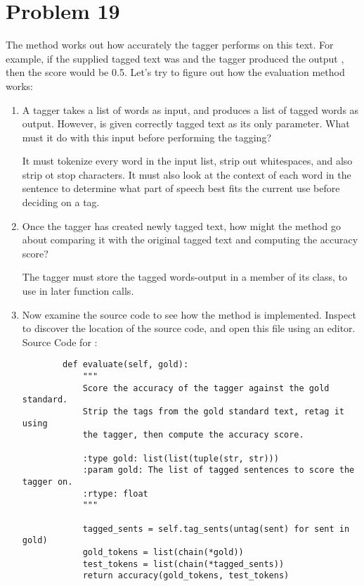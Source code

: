 \documentclass[12pt]{article}
\begin{document}
	\section*{Problem 19}
	The  method works out how accurately the tagger performs on this text. For example, if the supplied tagged text was  and the tagger produced the output , then the score would be 0.5. Let's try to figure out how the evaluation method works:
	\begin{enumerate}
		\item A tagger  takes a list of words as input, and produces a list of tagged words as output. However,  is given correctly tagged text as its only parameter. What must it do with this input before performing the tagging?
		
		It must tokenize every word in the input list, strip out whitespaces, and also strip ot stop characters. It must also look at the context of each word in the sentence to determine what part of speech best fits the current use before deciding on a tag. 
		
		\item Once the tagger has created newly tagged text, how might the  method go about comparing it with the original tagged text and computing the accuracy score?
		
		The tagger  must store the tagged words-output in a member of its class, to use in later function calls.
		
		\item Now examine the source code to see how the method is implemented. Inspect  to discover the location of the source code, and open this file using an editor.\\
		
		Source Code for :
		\begin{lstlisting}
		def evaluate(self, gold):
			"""
			Score the accuracy of the tagger against the gold standard.
			Strip the tags from the gold standard text, retag it using
			the tagger, then compute the accuracy score.
			
			:type gold: list(list(tuple(str, str)))
			:param gold: The list of tagged sentences to score the tagger on.
			:rtype: float
			"""
			
			tagged_sents = self.tag_sents(untag(sent) for sent in gold)
			gold_tokens = list(chain(*gold))
			test_tokens = list(chain(*tagged_sents))
			return accuracy(gold_tokens, test_tokens)
		\end{lstlisting}
	\end{enumerate}
	
\end{document}
